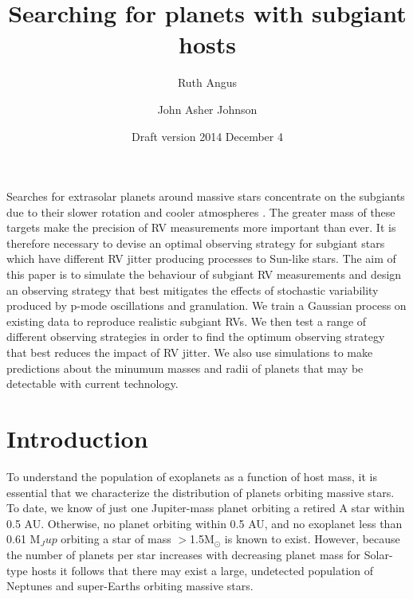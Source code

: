 \documentclass[useAMS, usenatbib]{aastex}
\title{Searching for planets with subgiant hosts}
\author{Ruth Angus}
\affil{Department of Physics, University of Oxford, UK}
\author{John Asher Johnson}
\affil{Harvard-Smithsonian Center for Astrophysics, Cambridge,
MA, USA}
\begin{document}
\date{Draft version 2014 December 4}
\maketitle


Searches for extrasolar planets around massive stars concentrate on
the subgiants due to their slower rotation and cooler atmospheres
\citep{Johnson2014}.
The greater mass of these targets make the precision of RV measurements more
important than ever.
It is therefore necessary to devise an optimal observing strategy for subgiant
stars which have different RV jitter producing processes to Sun-like stars.
The aim of this paper is to simulate the behaviour of subgiant RV
measurements and design an observing strategy that best mitigates the effects
of stochastic variability produced by p-mode oscillations and granulation.
We train a Gaussian process on existing data to reproduce realistic
subgiant RVs.
We then test a range of different observing strategies in order
to find the optimum observing strategy that best reduces the impact of
RV jitter.
We also use simulations to make predictions about the minumum masses and radii
of planets that may be detectable with current technology.


\section{Introduction}
\label{intro}

To understand the population of exoplanets as a function of host mass, it is
essential that we characterize the distribution of planets orbiting massive
stars.
To date, we know of just one Jupiter-mass planet orbiting a retired A star
within 0.5 AU.
Otherwise, no planet orbiting within 0.5 AU, and no exoplanet less than 0.61
M$_Jup$ orbiting a star of mass $>$1.5M$_{\odot}$ is known to exist.
However, because the number of planets per star increases with decreasing
planet mass for Solar-type hosts it follows that there may exist a large,
undetected population of Neptunes and super-Earths orbiting massive stars.

\end{document}
